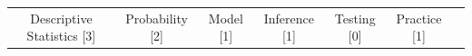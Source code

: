\begin{tcolorbox}
	\begin{tabular}[t]{ccccccc}
		Descriptive Statistics [3] & Probability [2] & Model [1] & Inference [1] & Testing [0] & Practice [1]
	\end{tabular}
\end{tcolorbox}
